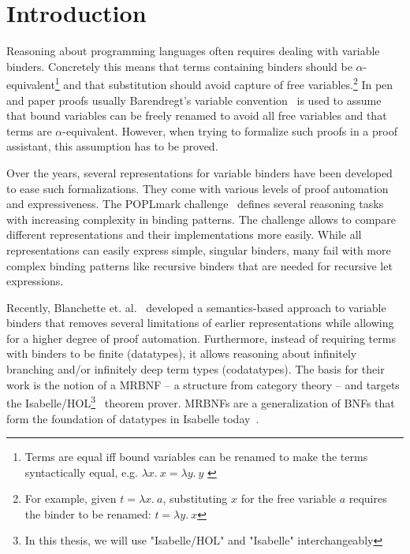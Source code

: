 \chapter{Introduction}\label{chapter:introduction}

Reasoning about programming languages often requires dealing with variable binders. Concretely this means that terms containing binders should be $\alpha$-equivalent\footnote{Terms are equal iff bound variables can be renamed to make the terms syntactically equal, e.g. $\lambda x. \: x = \lambda y. \: y$ \label{ftn:alpha-equivalence}} and that substitution should avoid capture of free variables.\footnote{For example, given $t = \lambda x. \: a$, substituting $x$ for the free variable $a$ requires the binder to be renamed: $t = \lambda y.\: x$} In pen and paper proofs usually Barendregt's variable convention~\cite{variable_convention} is used to assume that bound variables can be freely renamed to avoid all free variables and that terms are $\alpha$-equivalent. However, when trying to formalize such proofs in a proof assistant, this assumption has to be proved.

Over the years, several representations for variable binders have been developed to ease such formalizations. They come with various levels of proof automation and expressiveness. The POPLmark challenge~\cite{poplmark} defines several reasoning tasks with increasing complexity in binding patterns. The challenge allows to compare different representations and their implementations more easily. While all representations can easily express simple, singular binders, many fail with more complex binding patterns like recursive binders that are needed for recursive let expressions.

Recently, Blanchette et. al.~\cite{mrbnfs} developed a semantics-based approach to variable binders that removes several limitations of earlier representations while allowing for a higher degree of proof automation. Furthermore, instead of requiring terms with binders to be finite (datatypes), it allows reasoning about infinitely branching and/or infinitely deep term types (codatatypes). The basis for their work is the notion of a \acf{MRBNF} -- a structure from category theory -- and targets the Isabelle/HOL\footnote{In this thesis, we will use "Isabelle/HOL" and "Isabelle" interchangeably}~\cite{isabelle} theorem prover. \acp{MRBNF} are a generalization of \acp{BNF} that form the foundation of datatypes in Isabelle today~\cite{isabelle_datatypes}.

\pagebreak %

